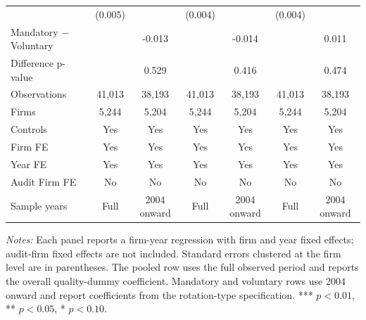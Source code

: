\begin{table}[htbp]
\begin{threeparttable}
{\begin{tabular}{l cc cc cc}
 & (0.005) &  & (0.004) &  & (0.004) &  \\
Mandatory $-$ Voluntary &  & -0.013 &  & -0.014 &  & 0.011 \\
Difference p-value &  & 0.529 &  & 0.416 &  & 0.474 \\
Observations & 41,013 & 38,193 & 41,013 & 38,193 & 41,013 & 38,193 \\
Firms & 5,244 & 5,204 & 5,244 & 5,204 & 5,244 & 5,204 \\
\midrule
Controls & Yes & Yes & Yes & Yes & Yes & Yes \\
Firm FE & Yes & Yes & Yes & Yes & Yes & Yes \\
Year FE & Yes & Yes & Yes & Yes & Yes & Yes \\
Audit Firm FE & No & No & No & No & No & No \\
Sample years & Full & 2004 onward & Full & 2004 onward & Full & 2004 onward \\
\bottomrule
\end{tabular}}
\begin{tablenotes}\footnotesize
\item \textit{Notes:} Each panel reports a firm-year regression with firm and year fixed effects; audit-firm fixed effects are not included. Standard errors clustered at the firm level are in parentheses. The pooled row uses the full observed period and reports the overall quality-dummy coefficient. Mandatory and voluntary rows use 2004 onward and report coefficients from the rotation-type specification. *** \(p<0.01\), ** \(p<0.05\), * \(p<0.10\).
\end{tablenotes}
\end{threeparttable}
\end{table}
